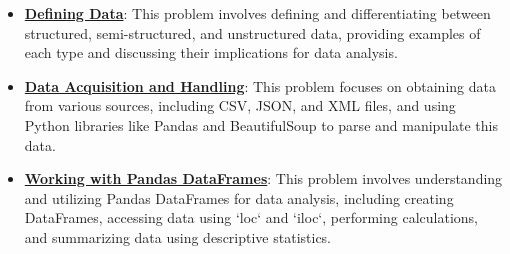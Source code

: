 \documentclass{article}%
\begin{document}
\begin{itemize}[leftmargin=*]%
\item \href{https://purdue.brightspace.com/d2l/common/assets/pdfjs-d2l-dist/1.0.14-legacy/web/viewer.html?file=\%2Fcontent\%2Fenforced\%2F1095465-WL.202510.CS24200.LE1\%2F04L1-data.pdf\%3Fou\%3D1095465\&lang=en-us\&container=d2l-fileviewer-rendered-pdf\&fullscreen=d2l-fileviewer-rendered-pdf-dialog\&height=667#page=6}{\textbf{Defining Data}}: This problem involves defining and differentiating between structured, semi-structured, and unstructured data, providing examples of each type and discussing their implications for data analysis.%
\item \href{https://purdue.brightspace.com/d2l/common/assets/pdfjs-d2l-dist/1.0.14-legacy/web/viewer.html?file=\%2Fcontent\%2Fenforced\%2F1095465-WL.202510.CS24200.LE1\%2F04L1-data.pdf\%3Fou\%3D1095465\&lang=en-us\&container=d2l-fileviewer-rendered-pdf\&fullscreen=d2l-fileviewer-rendered-pdf-dialog\&height=667#page=5}{\textbf{Data Acquisition and Handling}}: This problem focuses on obtaining data from various sources, including CSV, JSON, and XML files, and using Python libraries like Pandas and BeautifulSoup to parse and manipulate this data.%
\item \href{https://purdue.brightspace.com/d2l/common/assets/pdfjs-d2l-dist/1.0.14-legacy/web/viewer.html?file=\%2Fcontent\%2Fenforced\%2F1095465-WL.202510.CS24200.LE1\%2F04L1-data.pdf\%3Fou\%3D1095465\&lang=en-us\&container=d2l-fileviewer-rendered-pdf\&fullscreen=d2l-fileviewer-rendered-pdf-dialog\&height=667#page=17}{\textbf{Working with Pandas DataFrames}}: This problem involves understanding and utilizing Pandas DataFrames for data analysis, including creating DataFrames, accessing data using `loc` and `iloc`, performing calculations, and summarizing data using descriptive statistics.%
\end{itemize}%
\end{document}
